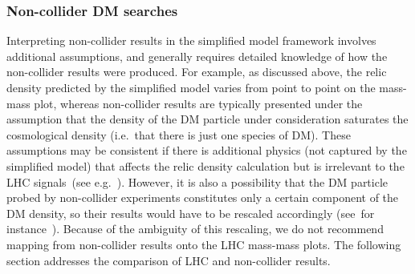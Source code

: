 \subsubsection{Non-collider DM searches}
\label{sub:non-colliderdmsearches}


Interpreting non-collider results  in the simplified model framework involves additional assumptions, and generally requires detailed knowledge of how the non-collider results were produced.
For example, as discussed above, the relic density predicted by the simplified model varies from point to point on the mass-mass plot, whereas non-collider results are typically presented under the assumption that the density of the DM particle under consideration saturates the cosmological density (i.e.\ that there is just one species of DM). These assumptions may be consistent if there is additional physics (not captured by the simplified model) that affects the relic density calculation but is irrelevant to the LHC signals~(see e.g.~\cite{Gelmini:2010zh}). However, it is also a possibility that the DM particle probed by non-collider experiments constitutes only a certain component of the DM density, so their results would have to be rescaled accordingly (see~for instance~\cite{Chala:2015ama}). Because of the ambiguity of this rescaling, we do not recommend mapping from non-collider results onto the LHC mass-mass plots. The following section addresses the comparison of LHC and non-collider results. 



